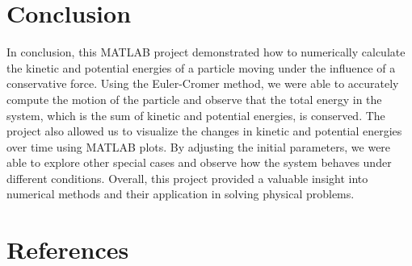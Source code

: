 \documentclass[13pt,a4paper]{report}
\begin{document}
\newpage
\section{Conclusion}
In conclusion, this MATLAB project demonstrated how to numerically calculate the kinetic and potential energies of a particle moving under the influence of a conservative force. Using the Euler-Cromer method, we were able to accurately compute the motion of the particle and observe that the total energy in the system, which is the sum of kinetic and potential energies, is conserved. The project also allowed us to visualize the changes in kinetic and potential energies over time using MATLAB plots. By adjusting the initial parameters, we were able to explore other special cases and observe how the system behaves under different conditions. Overall, this project provided a valuable insight into numerical methods and their application in solving physical problems.

\newpage
\section{References}
\vspace{0.25cm}
\begin{itemize}[leftmargin=-0.655cm, label=]
    \begin{otherlanguage}{vietnamese}
        \nocite{*}%
        \printbibliography[heading=none]
    \end{otherlanguage}
\end{itemize}
\end{document}
